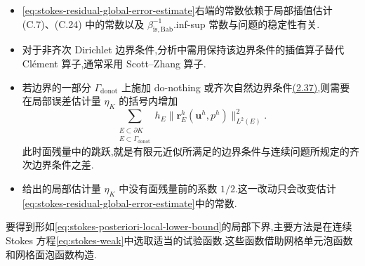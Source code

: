 \begin{note}[关于全局上界]\label{note:stokes-residual-global-upper-estimate}
\begin{itemize}
  \item \cref{eq:stokes-residual-global-error-estimate}右端的常数依赖于局部插值估计 (C.7)、(C.24) 中的常数以及 $\beta_{\mathrm{is,Bab}}^{-1}$.inf-sup 常数与问题的稳定性有关.
  \item 对于非齐次 Dirichlet 边界条件,分析中需用保持该边界条件的插值算子替代 Clément 算子,通常采用 Scott--Zhang 算子\parencite{ScottZhang1990}.
  \item 若边界的一部分 $\Gamma_{\mathrm{donot}}$ 上施加 do-nothing 或齐次自然边界条件\hyperref[eq:do-nothing-condition]{(2.37)},则需要在局部误差估计量 $\eta_K$ 的括号内增加
  \[
    \sum_{\substack{E\subset\partial K\\E\subset\Gamma_{\mathrm{donot}}}}
       h_E\|\bm{r}_E^h(\bm{u}^h,p^h)\|_{L^2(E)}^2.
  \]
  此时面残量中的跳跃,就是有限元近似所满足的边界条件与连续问题所规定的齐次边界条件之差.
  \item \textcite[第 243 页]{Verfuerth2013}给出的局部估计量 $\eta_K$ 中没有面残量前的系数 $1/2$.这一改动只会改变估计\cref{eq:stokes-residual-global-error-estimate}中的常数.
\end{itemize}
\end{note}
\begin{note}[局部下界的主要证明思路]\label{note:stokes-residual-local-lower-strategy}
要得到形如\cref{eq:stokes-posteriori-local-lower-bound}的局部下界,主要方法是在连续 Stokes 方程\cref{eq:stokes-weak}中选取适当的试验函数.这些函数借助网格单元泡函数和网格面泡函数构造.
\end{note}

